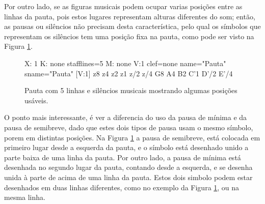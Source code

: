 Por outro lado, se as figuras musicais podem ocupar varias posições entre as linhas da pauta,
pois estos lugares representam alturas diferentes do som; então, 
as pausas  ou silêncios não precisam desta característica,
pelo qual os símbolos que representam os silêncios tem uma posição fixa na pauta,
como pode ser visto na Figura \ref{fig:abc-pautasilencio}.
\begin{figure}[h]
\centering
\begin{abc}[name=abc-pautasilencio]
%
X: 1 %
K: none stafflines=5 %
M: none %
V:1 clef=none name="Pauta"   sname="Pauta"
%
[V:1] z8 z4 z2 z1 z/2 z/4 G8 A4 B2 C'1 D'/2 E'/4 
\end{abc}
\caption{Pauta com 5 linhas e silêncios musicais mostrando algumas posições usáveis.}
\label{fig:abc-pautasilencio}
\end{figure}

O ponto mais interessante, é ver a diferencia do uso  da pausa de mínima e da pausa de semibreve,
dado que estes dois tipos de pausa usam o mesmo símbolo, porem em distintas posições.
Na Figura \ref{fig:abc-pautasilencio} a pausa de semibreve, 
está colocada em primeiro lugar desde a esquerda da pauta,
e o símbolo está desenhado unido a parte baixa de uma linha da pauta.
Por outro lado, a pausa de mínima está desenhada no segundo lugar da pauta,
contando desde a esquerda, e se desenha unida à parte de acima de uma linha da pauta.
Estos dois simbolo podem estar desenhados em duas linhas diferentes, 
como no exemplo da Figura \ref{fig:abc-pautasilencio}, ou na mesma linha.

